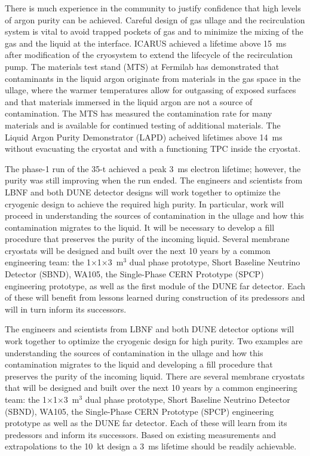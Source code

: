 There is much experience in the community to justify confidence that
high levels of argon purity can be achieved.  Careful design of gas
ullage and the recirculation system is vital to avoid trapped pockets
of gas and to minimize the mixing of the gas and the liquid at the
interface.  ICARUS achieved a lifetime above 15~ms after modification of
the cryosystem to extend the lifecycle of the recirculation
pump.\cite{Antonello:2014eha} The materials test stand (MTS) at Fermilab has
demonstrated that contaminants in the liquid argon originate from
materials in the gas space in the ullage, where the warmer
temperatures allow for outgassing of exposed surfaces and that
materials immersed in the liquid argon are not a source of
contamination.\cite{andrewsNIM} The MTS has measured the
contamination rate for many materials and is available for
continued testing of additional materials.  The Liquid Argon Purity
Demonstrator (LAPD) acheived lifetimes above 14~ms without evacuating
the cryostat and with a functioning TPC inside the
cryostat.\cite{Bromberg:2015uia}


The phase-1 run of the 35-t achieved a peak 3~ms electron lifetime;
however, the purity was still improving when the run ended.   
The
engineers and scientists from LBNF and both DUNE detector designs will
work together to optimize the cryogenic design to achieve the required high purity. 
In particular, work will proceed in understanding the sources of contamination in the ullage
and how this contamination migrates to the liquid. It will be necessary to develop a
fill procedure that preserves the purity of the incoming liquid.
Several membrane cryostats will be designed and built
over the next 10 years by a common engineering team: the
1$\times$1$\times$3~m$^3$ dual phase prototype, Short Baseline
Neutrino Detector (SBND), WA105, the Single-Phase CERN Prototype
(SPCP) engineering prototype, as well as the first module of the DUNE far detector. 
Each of
these will benefit from lessons learned during construction of its predessors and will in turn inform its successors. 

 The
engineers and scientists from LBNF and both DUNE detector options will
work together to optimize the cryogenic design for high purity. Two
examples are understanding the sources of contamination in the ullage
and how this contamination migrates to the liquid and developing a
fill procedure that preserves the purity of the incoming liquid.
There are several membrane cryostats that will be designed and built
over the next 10 years by a common engineering team: the
1$\times$1$\times$3~m$^3$ dual phase prototype, Short Baseline
Neutrino Detector (SBND), WA105, the Single-Phase CERN Prototype
(SPCP) engineering prototype as well as the DUNE far detector. Each of
these will learn from its predessors and inform its successors. Based
on existing measurements and extrapolations to the 10~kt design a 3~ms
lifetime should be readily achievable.


